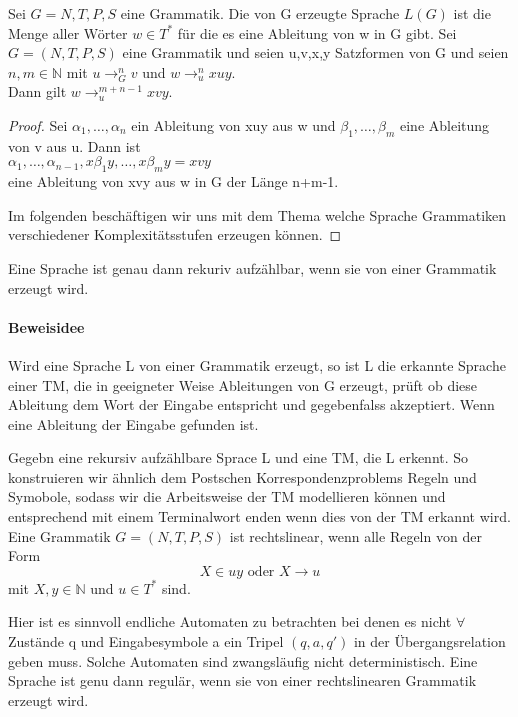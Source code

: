     Sei \(G=N,T,P,S\) eine Grammatik. Die von G erzeugte Sprache \(L(G)\) ist die Menge aller Wörter \(w\in T^*\) für die es eine Ableitung von w in G gibt.
    Sei \(G=(N,T,P,S)\) eine Grammatik und seien u,v,x,y Satzformen von G und seien \(n,m\in\mathbb{N}\) mit \(u\to_G^nv\) und \(w\to_u^nxuy\).\\
    Dann gilt \(w\to_u^{m+n-1}xvy\).
\begin{proof}
    Sei \(\alpha _1,\dots,\alpha_n\) ein Ableitung von xuy aus w und \(\beta_1,\dots,\beta_m\) eine Ableitung von v aus u. Dann ist\\ 
    \(\alpha_1,\dots,\alpha_{n-1},x\beta_1y,\dots,x\beta_my=xvy\)\\
    eine Ableitung von xvy aus w in G der Länge n+m-1.\par\bigskip
    Im folgenden beschäftigen wir uns mit dem Thema welche Sprache Grammatiken verschiedener Komplexitätsstufen erzeugen können.
\end{proof}

    Eine Sprache ist genau dann rekuriv aufzählbar, wenn sie von einer Grammatik erzeugt wird.
\paragraph*{Beweisidee} Wird eine Sprache L von einer Grammatik erzeugt, so ist L die erkannte Sprache einer TM, die in geeigneter Weise Ableitungen von G erzeugt, prüft ob diese Ableitung dem Wort der Eingabe entspricht und gegebenfalss akzeptiert. Wenn eine Ableitung der Eingabe gefunden ist.\par\bigskip
Gegebn eine rekursiv aufzählbare Sprace L und eine TM, die L erkennt. So konstruieren wir ähnlich dem Postschen Korrespondenzproblems Regeln und Symobole, sodass wir die Arbeitsweise der TM modellieren können und entsprechend mit einem Terminalwort enden wenn dies von der TM erkannt wird.
    Eine Grammatik \(G=(N,T,P,S)\) ist rechtslinear, wenn alle Regeln von der Form 
    \[X\in uy \text{ oder } X\to u\]
    mit \(X,y\in\mathbb{N}\) und \(u\in T^*\) sind.\par\bigskip 
    Hier ist es sinnvoll endliche Automaten zu betrachten bei denen es nicht \(\forall\) Zustände q und Eingabesymbole a ein Tripel \((q,a,q')\) in der Übergangsrelation geben muss. Solche Automaten sind zwangsläufig nicht deterministisch.
Eine Sprache ist genu dann regulär, wenn sie von einer rechtslinearen Grammatik erzeugt wird.
